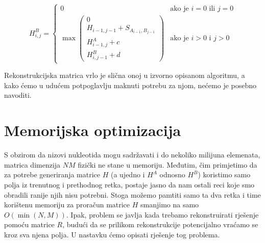 \documentclass[times, utf8, zavrsni]{fer}
\begin{document}
$$
H^{B}_{i,j} =
\left\{ \begin{array}{ll}
	0 & \mbox{ako je } i=0 \mbox{ ili } j=0 \\
	\max \left( \begin{array}{l}
		0 \\
		H_{i-1,j-1} + S_{A_{i-1}, B_{j-1}} \\
		H^A_{i-1, j} + c \\
		H^B_{i, j-1} + d
	\end{array} \right) & \mbox{ako je } i>0 \mbox{ i } j>0
\end{array} \right.
$$

Rekonstrukcijska matrica vrlo je slična onoj u izvorno opisanom
algoritmu, a kako ćemo u udućem potpoglavlju maknuti potrebu za njom,
nećemo je posebno navoditi. 

\section{Memorijska optimizacija}
S obzirom da nizovi nukleotida mogu sadržavati i do nekoliko milijuna
elemenata, matrica dimenzija $N M$ fizički ne stane u memoriju. 
Međutim, čim primjetimo da za potrebe generiranja matrice $H$ (a ujedno i
$H^A$ odnosno $H^B$) koristimo
samo polja iz trenutnog i prethodnog retka, postaje jasno da nam ostali 
reci koje smo obradili ranije njih nisu potrebni. Stoga možemo pamtiti 
samo ta dva retka i time korištenu memoriju za proračun
matrice $H$ smanjimo na samo $O(\min(N, M))$. Ipak, problem se javlja
kada trebamo rekonstruirati rješenje pomoću matrice $R$, budući da
se prilikom rekonstrukcije potencijalno vraćamo se kroz sva njena polja. U
nastavku ćemo opisati rješenje tog problema.
\end{document}
